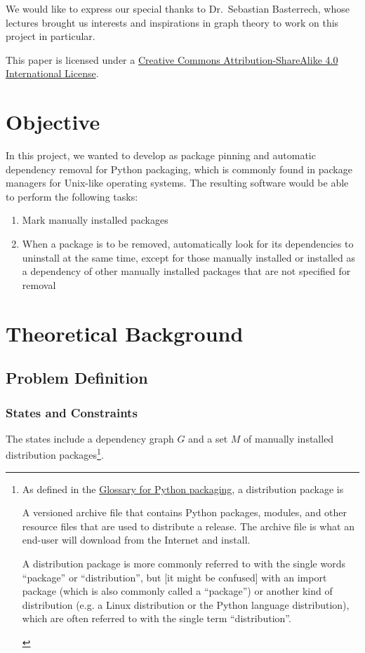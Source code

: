 \documentclass[a4paper,12pt]{article}
\begin{document}
We would like to express our special thanks to Dr.~Sebastian Basterrech,
whose lectures brought us interests and inspirations in graph theory
to work on this project in particular.

This paper is licensed under
a \href{https://creativecommons.org/licenses/by-sa/4.0/}{Creative Commons
Attribution-ShareAlike 4.0 International License}.
\pagebreak

\section{Objective}
In this project, we wanted to develop as package pinning
and automatic dependency removal for Python packaging, which is commonly found
in package managers for Unix-like operating systems.  The resulting software
would be able to perform the following tasks:

\begin{enumerate}
  \item Mark manually installed packages
  \item When a package is to be removed, automatically look for
    its dependencies to uninstall at the same time, except for those
    manually installed or installed as a dependency of other manually installed
    packages that are not specified for removal
\end{enumerate}

\section{Theoretical Background}
\subsection{Problem Definition}
\subsubsection{States and Constraints}
The states include a dependency graph $G$ and a set $M$
of manually installed distribution packages\footnote{As defined in
the \href{https://packaging.python.org/glossary}{Glossary for Python packaging},
a distribution package is
\begin{displayquote}
  A versioned archive file that contains Python packages, modules,
  and other resource files that are used to distribute a release.
  The archive file is what an end-user will download from the Internet
  and install.

  A distribution package is more commonly referred to with the single words
  ``package'' or ``distribution'', but [it might be confused] with
  an import package (which is also commonly called a ``package'')
  or another kind of distribution (e.g. a Linux distribution
  or the Python language distribution), which are often referred to
  with the single term ``distribution''.
\end{displayquote}}.
\end{document}
